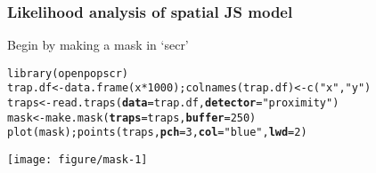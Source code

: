 \documentclass[color=usenames,dvipsnames]{beamer}\usepackage[]{graphicx}\usepackage[]{xcolor}
\makeatletter
\newcommand{\hlnum}[1]{\textcolor[rgb]{0.69,0.494,0}{#1}}%
\newcommand{\hlsng}[1]{\textcolor[rgb]{0.749,0.012,0.012}{#1}}%
\newcommand{\hlopt}[1]{\textcolor[rgb]{0,0,0}{#1}}%
\newcommand{\hldef}[1]{\textcolor[rgb]{0,0,0}{#1}}%
\newcommand{\hlkwb}[1]{\textcolor[rgb]{0,0.341,0.682}{#1}}%
\newcommand{\hlkwc}[1]{\textcolor[rgb]{0,0,0}{\textbf{#1}}}%
\newcommand{\hlkwd}[1]{\textcolor[rgb]{0.004,0.004,0.506}{#1}}%
\newenvironment{kframe}{%
 \def\at@end@of@kframe{}%
 \ifinner\ifhmode%
  \def\at@end@of@kframe{\end{minipage}}%
  \begin{minipage}{\columnwidth}%
 \fi\fi%
 \def\FrameCommand##1{\hskip\@totalleftmargin \hskip-\fboxsep
 \colorbox{shadecolor}{##1}\hskip-\fboxsep
     \hskip-\linewidth \hskip-\@totalleftmargin \hskip\columnwidth}%
 \MakeFramed {\advance\hsize-\width
   \@totalleftmargin\z@ \linewidth\hsize
   \@setminipage}}%
 {\par\unskip\endMakeFramed%
 \at@end@of@kframe}
\newenvironment{knitrout}{}{} %
\makeatother
\begin{document}
\begin{frame}[fragile]
  \frametitle{Likelihood analysis of spatial JS model}
Begin by making a mask in `secr'
\begin{knitrout}\scriptsize
{}\color{fgcolor}\begin{kframe}
\begin{alltt}
\hlkwd{library}\hldef{(openpopscr)}
\hldef{trap.df} \hlkwb{<-} \hlkwd{data.frame}\hldef{(x}\hlopt{*}\hlnum{1000}\hldef{);} \hlkwd{colnames}\hldef{(trap.df)} \hlkwb{<-} \hlkwd{c}\hldef{(}\hlsng{"x"}\hldef{,}\hlsng{"y"}\hldef{)}
\hldef{traps} \hlkwb{<-} \hlkwd{read.traps}\hldef{(}\hlkwc{data}\hldef{=trap.df,} \hlkwc{detector}\hldef{=}\hlsng{"proximity"}\hldef{)}
\hldef{mask} \hlkwb{<-} \hlkwd{make.mask}\hldef{(}\hlkwc{traps}\hldef{=traps,} \hlkwc{buffer}\hldef{=}\hlnum{250}\hldef{)}
\hlkwd{plot}\hldef{(mask);} \hlkwd{points}\hldef{(traps,} \hlkwc{pch}\hldef{=}\hlnum{3}\hldef{,} \hlkwc{col}\hldef{=}\hlsng{"blue"}\hldef{,} \hlkwc{lwd}\hldef{=}\hlnum{2}\hldef{)}
\end{alltt}
\end{kframe}

{\centering \texttt{[image: figure/mask-1]} 

}


\end{knitrout}
\end{frame}
\end{document}
